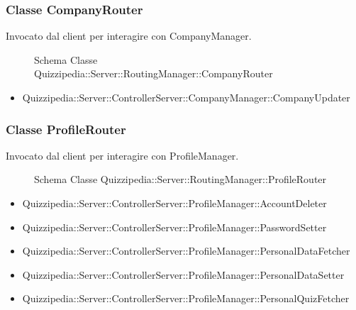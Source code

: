 \subsubsection{Classe CompanyRouter}
Invocato dal client per interagire con CompanyManager.
\begin{figure}[H]
\centering
\noindent{}
\caption[Schema Classe CompanyRouter]{Schema Classe Quizzipedia::Server::RoutingManager::CompanyRouter}
\end{figure}
\begin{itemize}
\item Quizzipedia::Server::ControllerServer::CompanyManager::CompanyUpdater
\end{itemize}
\subsubsection{Classe ProfileRouter}
Invocato dal client per interagire con ProfileManager.
\begin{figure}[H]
\centering
\noindent{}
\caption[Schema Classe ProfileRouter]{Schema Classe Quizzipedia::Server::RoutingManager::ProfileRouter}
\end{figure}
\begin{itemize}
\item Quizzipedia::Server::ControllerServer::ProfileManager::AccountDeleter
\item Quizzipedia::Server::ControllerServer::ProfileManager::PasswordSetter
\item Quizzipedia::Server::ControllerServer::ProfileManager::PersonalDataFetcher
\item Quizzipedia::Server::ControllerServer::ProfileManager::PersonalDataSetter
\item Quizzipedia::Server::ControllerServer::ProfileManager::PersonalQuizFetcher
\end{itemize}
